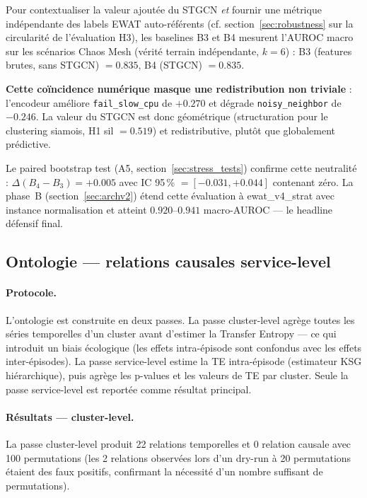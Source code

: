 Pour contextualiser la valeur ajoutée du STGCN \emph{et} fournir une métrique indépendante
des labels EWAT auto-référents (cf. section~\ref{sec:robustness} sur la circularité de
l'évaluation H3), les baselines B3 et B4 mesurent l'AUROC macro sur les scénarios Chaos Mesh
(vérité terrain indépendante, $k = 6$) :
B3 (features brutes, sans STGCN) $= 0.835$, B4 (STGCN) $= 0.835$.

\textbf{Cette coïncidence numérique masque une redistribution non triviale} : l'encodeur
améliore \texttt{fail\_slow\_cpu} de $+0.270$ et dégrade \texttt{noisy\_neighbor} de $-0.246$.
La valeur du STGCN est donc géométrique (structuration pour le clustering siamois,
H1 sil $= 0.519$) et redistributive, plutôt que globalement prédictive.

Le paired bootstrap test (A5, section~\ref{sec:stress_tests}) confirme cette neutralité :
$\Delta(B_4 - B_3) = +0.005$ avec IC 95\,\% $= [-0.031, +0.044]$ contenant zéro. La phase~B
(section~\ref{sec:archv2}) étend cette évaluation à ewat\_v4\_strat avec instance normalisation
et atteint $0.920$--$0.941$ macro-AUROC --- le headline défensif final.

\subsection{Ontologie --- relations causales service-level}
\label{sec:ontology_results}

\paragraph{Protocole.}
L'ontologie est construite en deux passes. La passe cluster-level agrège toutes les
séries temporelles d'un cluster avant d'estimer la Transfer Entropy --- ce qui introduit
un biais écologique (les effets intra-épisode sont confondus avec les effets inter-épisodes).
La passe service-level estime la TE intra-épisode (estimateur KSG hiérarchique),
puis agrège les p-values et les valeurs de TE par cluster. Seule la passe service-level
est reportée comme résultat principal.

\paragraph{Résultats --- cluster-level.}
La passe cluster-level produit 22 relations temporelles et 0 relation causale avec
100 permutations (les 2 relations observées lors d'un dry-run à 20 permutations étaient
des faux positifs, confirmant la nécessité d'un nombre suffisant de permutations).

